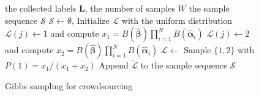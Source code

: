 \documentclass{article}
\begin{document}
  \begin{wrapfigure}{R}{0.6\textwidth}
  \centering
    \begin{minipage}{0.6\textwidth}
\begin{algorithm}[H]
  \caption{Gibbs sampling for crowdsourcing}
  \label{GSC}
  \small
\begin{algorithmic}[1]
  \vspace{0.5mm}
   the collected labels $\bm{L}$, the number of samples $W$
   the sample sequence $\mathcal{S}$
  \vspace{0.5mm}
  \STATE $\mathcal{S}\leftarrow\emptyset$, Initialize $\mathcal{L}$ with the uniform distribution
  \STATE $\mathcal{L}(j) \leftarrow 1$ and compute $x_1= B(\hat{\bm{\beta}})\prod_{i=1}^{N}B(\hat{\bm{\alpha}}_{i})$
  \STATE $\mathcal{L}(j) \leftarrow 2$ and compute $x_2= B(\hat{\bm{\beta}})\prod_{i=1}^{N}B(\hat{\bm{\alpha}}_{i})$
  \STATE $\mathcal{L} \leftarrow$ Sample $\{1,2\}$ with $P(1)=x_1/(x_1+x_2)$
  \ENDFOR
  \STATE Append $\tilde{\mathcal{L}}$ to the sample sequence $\mathcal{S}$
  \ENDFOR
\end{algorithmic}
\end{algorithm}
    \end{minipage}
  \end{wrapfigure}
\end{document}
